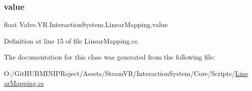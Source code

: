 \subsubsection{\texorpdfstring{value}{value}}
{\footnotesize\ttfamily float Valve.\+V\+R.\+Interaction\+System.\+Linear\+Mapping.\+value}



Definition at line 15 of file Linear\+Mapping.\+cs.



The documentation for this class was generated from the following file\+:\begin{DoxyCompactItemize}
\item 
O\+:/\+Git\+H\+U\+B\+M\+I\+N\+I\+P\+Roject/\+Assets/\+Steam\+V\+R/\+Interaction\+System/\+Core/\+Scripts/\mbox{\hyperlink{_linear_mapping_8cs}{Linear\+Mapping.\+cs}}\end{DoxyCompactItemize}
